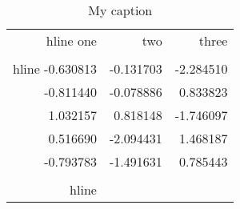 \begin{table}[h]
\centering
\caption{My caption}
\label{my_label}
\begin{tabular}{rrr}
\\hline
      one &       two &     three \\
\\hline
-0.630813 & -0.131703 & -2.284510 \\
-0.811440 & -0.078886 &  0.833823 \\
 1.032157 &  0.818148 & -1.746097 \\
 0.516690 & -2.094431 &  1.468187 \\
-0.793783 & -1.491631 &  0.785443 \\
\\hline
\end{tabular}
\end{table}
